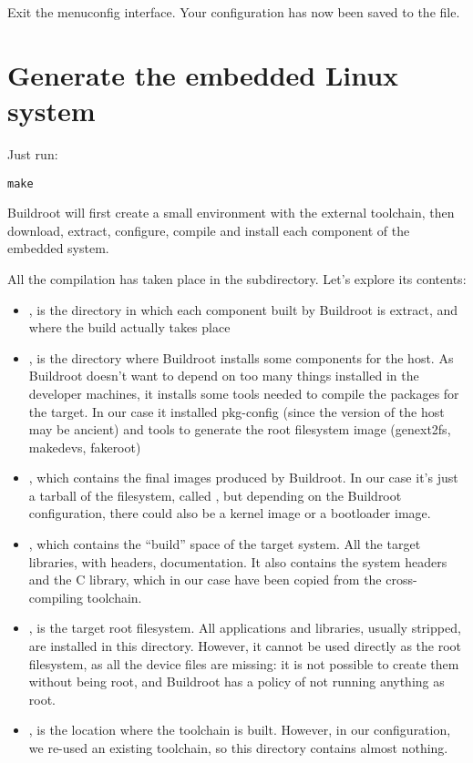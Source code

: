 Exit the menuconfig interface. Your configuration has now been saved
to the  file.

\section{Generate the embedded Linux system}

Just run:

\begin{verbatim}
make
\end{verbatim}

Buildroot will first create a small environment with the external
toolchain, then download, extract, configure, compile and install each
component of the embedded system.

All the compilation has taken place in the  subdirectory. Let's
explore its contents:

\begin{itemize}

\item {}, is the directory in which each component built by
  Buildroot is extract, and where the build actually takes place

\item {}, is the directory where Buildroot installs some
  components for the host. As Buildroot doesn't want to depend on too
  many things installed in the developer machines, it installs some
  tools needed to compile the packages for the target. In our case it
  installed pkg-config (since the version of the host may be ancient)
  and tools to generate the root filesystem image (genext2fs,
  makedevs, fakeroot)

\item {}, which contains the final images produced by
  Buildroot. In our case it's just a tarball of the filesystem, called
  , but depending on the Buildroot configuration,
  there could also be a kernel image or a bootloader image.

\item {}, which contains the “build” space of the target
  system. All the target libraries, with headers, documentation. It
  also contains the system headers and the C library, which in our
  case have been copied from the cross-compiling toolchain.

\item {}, is the target root filesystem. All applications
  and libraries, usually stripped, are installed in this
  directory. However, it cannot be used directly as the root
  filesystem, as all the device files are missing: it is not possible
  to create them without being root, and Buildroot has a policy of not
  running anything as root.

\item {}, is the location where the toolchain is
  built. However, in our configuration, we re-used an existing
  toolchain, so this directory contains almost nothing.

\end{itemize}

